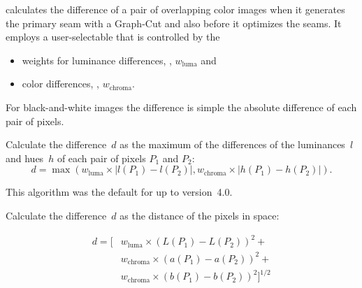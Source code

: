 \begin{codelist}
  \App{} calculates the difference of a pair of overlapping color images when it generates the
  primary seam with a Graph-Cut and also before it optimizes the seams.  It employs a
  user-selectable  that is controlled by the

  \begin{itemize}
  \item
    weights for luminance differences, ,
    $w_{\mathrm{luma}}$ and

  \item
    color differences, , $w_{\mathrm{chroma}}$.
  \end{itemize}

  For black-and-white images the difference is simple the absolute difference of each pair of
  pixels.

  \begin{codelist}
  \item[\itempar{maximum-hue-luminance \\ maximum-hue-lum
      \\ max-hue-luminance \\ max-hue-lum \\ max}]\itemend Calculate
    the difference~$d$ as the maximum of
    the differences of the luminances~$l$ and hues~$h$ of each pair
    of pixels $P_1$ and $P_2$:
    \[
    d  = \max\left(w_{\mathrm{luma}} \times |l(P_1) - l(P_2)|,
    w_{\mathrm{chroma}} \times |h(P_1) - h(P_2)|\right).
    \]

    This algorithm was the default for \App{} up to version~4.0.

  \item[\itempar{delta-e \\ de}]\itemend
    Calculate the difference~$d$ as the  distance of the pixels in
     space:

    \begin{align*}
      d = \Big[ & w_{\mathrm{luma}} \times \left(L(P_1) - L(P_2)\right)^2 + \\
                & w_{\mathrm{chroma}} \times \left(a(P_1) - a(P_2)\right)^2 + \\
                & w_{\mathrm{chroma}} \times \left(b(P_1) - b(P_2)\right)^2
        \Big]^{1/2}
    \end{align*}


\end{codelist}
\end{codelist}
